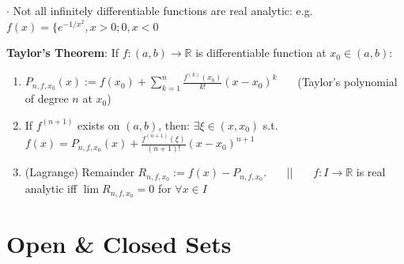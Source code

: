\documentclass[9pt]{article}
\begin{document}
$\cdot$ {\footnotesize Not all infinitely differentiable functions are real analytic: e.g.$f(x)=\{e^{-1/x^2},x>0;0,x<0$}

\textbf{Taylor's Theorem}: If $f:(a,b)\to\mathbb{R}$ is differentiable function at $x_0\in(a,b)$:
\begin{enumerate}[itemsep=-2pt, topsep=-2pt]
    \item $P_{n,f,x_0}(x):=f(x_0)+\sum_{k=1}^{n}\frac{f^{(k)}(x_0)}{k!}(x-x_0)^k$ \ \ \ (Taylor's polynomial of degree $n$ at $x_0$)
    \vspace{-4pt}
    \item If $f^{(n+1)}$ exists on $(a,b)$, then: $\exists \xi\in(x,x_0)$ s.t. $f(x)=P_{n,f,x_0}(x)+\frac{f^{(n+1)}(\xi)}{(n+1)!}(x-x_0)^{n+1}$
    \item (Lagrange) Remainder $R_{n,f,x_0}:=f(x)-P_{n,f,x_0}$. \ \ \ || \ \ \ $f:I\to\mathbb{R}$ is real analytic iff $\lim R_{n,f,x_0}=0$ for $\forall x\in I$
\end{enumerate}


\section{Open \& Closed Sets}
\end{document}
